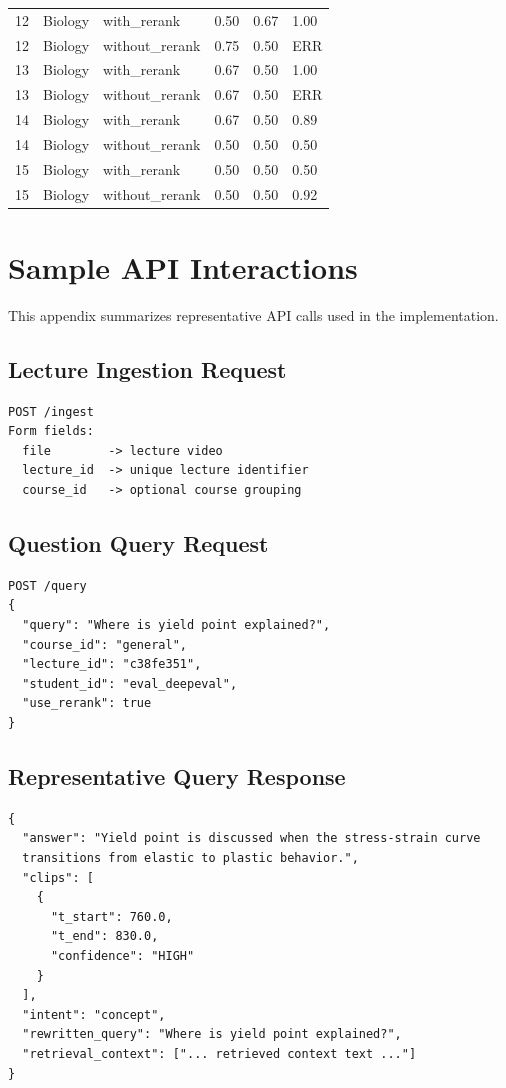 \documentclass[12pt,a4paper,oneside]{report}
\begin{document}
\begin{longtable}{p{} p{} p{} p{} p{} p{}}
12 & Biology & with\_rerank & 0.50 & 0.67 & 1.00 \\
12 & Biology & without\_rerank & 0.75 & 0.50 & ERR \\
13 & Biology & with\_rerank & 0.67 & 0.50 & 1.00 \\
13 & Biology & without\_rerank & 0.67 & 0.50 & ERR \\
14 & Biology & with\_rerank & 0.67 & 0.50 & 0.89 \\
14 & Biology & without\_rerank & 0.50 & 0.50 & 0.50 \\
15 & Biology & with\_rerank & 0.50 & 0.50 & 0.50 \\
15 & Biology & without\_rerank & 0.50 & 0.50 & 0.92 \\
\bottomrule
\end{longtable}

\chapter{Sample API Interactions}
This appendix summarizes representative API calls used in the implementation.

\section*{Lecture Ingestion Request}
\begin{verbatim}
POST /ingest
Form fields:
  file        -> lecture video
  lecture_id  -> unique lecture identifier
  course_id   -> optional course grouping
\end{verbatim}

\section*{Question Query Request}
\begin{verbatim}
POST /query
{
  "query": "Where is yield point explained?",
  "course_id": "general",
  "lecture_id": "c38fe351",
  "student_id": "eval_deepeval",
  "use_rerank": true
}
\end{verbatim}

\section*{Representative Query Response}
\begin{verbatim}
{
  "answer": "Yield point is discussed when the stress-strain curve
  transitions from elastic to plastic behavior.",
  "clips": [
    {
      "t_start": 760.0,
      "t_end": 830.0,
      "confidence": "HIGH"
    }
  ],
  "intent": "concept",
  "rewritten_query": "Where is yield point explained?",
  "retrieval_context": ["... retrieved context text ..."]
}
\end{verbatim}
\end{document}
